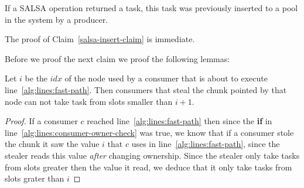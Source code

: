 \begin{claim}
\label{salsa-insert-claim}
 If a SALSA operation returned a task, this task was previously inserted to a pool in the system by a producer.
\end{claim}
\noindent
The proof of Claim~\ref{salsa-insert-claim} is immediate.

\vspace{5pt}\noindent
Before we proof the next claim we proof the following lemmas:

\begin{lemma}
 \label{lemma:steal-take-bound}
 Let $i$ be the $idx$ of the node used by a consumer that is about to execute line~\ref{alg:lines:fast-path}. Then consumers that steal the chunk pointed by that node can not take task from slots smaller than $i+1$. 
\end{lemma}
\begin{proof}
 If a consumer $c$ reached line~\ref{alg:lines:fast-path} then since the {\bf if} in line~\ref{alg:lines:consumer-owner-check} was true, we know that if a consumer stole the chunk it saw the value $i$ that $c$ uses in line~\ref{alg:lines:fast-path}, since the stealer reads this value \emph{after} changing ownership. Since the stealer only take tasks from slots greater then the value it read, we deduce that it only take tasks from slots grater than $i$
\end{proof}

